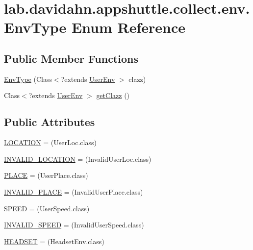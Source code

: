 \hypertarget{enumlab_1_1davidahn_1_1appshuttle_1_1collect_1_1env_1_1_env_type}{\section{lab.\-davidahn.\-appshuttle.\-collect.\-env.\-Env\-Type \-Enum \-Reference}
\label{enumlab_1_1davidahn_1_1appshuttle_1_1collect_1_1env_1_1_env_type}
}
\subsection*{\-Public \-Member \-Functions}
\begin{DoxyCompactItemize}
\item 
\hyperlink{enumlab_1_1davidahn_1_1appshuttle_1_1collect_1_1env_1_1_env_type_a71e5659577c8af2c28bbef2caa61bb91}{\-Env\-Type} (\-Class$<$?extends \hyperlink{classlab_1_1davidahn_1_1appshuttle_1_1collect_1_1env_1_1_user_env}{\-User\-Env} $>$ clazz)
\item 
\-Class$<$?extends \hyperlink{classlab_1_1davidahn_1_1appshuttle_1_1collect_1_1env_1_1_user_env}{\-User\-Env} $>$ \hyperlink{enumlab_1_1davidahn_1_1appshuttle_1_1collect_1_1env_1_1_env_type_a51b2442353c7736d39ce93dc70b6fe68}{get\-Clazz} ()
\end{DoxyCompactItemize}
\subsection*{\-Public \-Attributes}
\begin{DoxyCompactItemize}
\item 
\hyperlink{enumlab_1_1davidahn_1_1appshuttle_1_1collect_1_1env_1_1_env_type_a513b43e6ae19fc27a54ea3e5dab0d8dd}{\-L\-O\-C\-A\-T\-I\-O\-N} = (\-User\-Loc.\-class)
\item 
\hyperlink{enumlab_1_1davidahn_1_1appshuttle_1_1collect_1_1env_1_1_env_type_adee403a5cfd19ab6c6db598f030f4e67}{\-I\-N\-V\-A\-L\-I\-D\-\_\-\-L\-O\-C\-A\-T\-I\-O\-N} = (\-Invalid\-User\-Loc.\-class)
\item 
\hyperlink{enumlab_1_1davidahn_1_1appshuttle_1_1collect_1_1env_1_1_env_type_a9be23479dc6fcfb275eb596bd226b914}{\-P\-L\-A\-C\-E} = (\-User\-Place.\-class)
\item 
\hyperlink{enumlab_1_1davidahn_1_1appshuttle_1_1collect_1_1env_1_1_env_type_a9ce16cf07ad3c05697cbfb3d6f70ed83}{\-I\-N\-V\-A\-L\-I\-D\-\_\-\-P\-L\-A\-C\-E} = (\-Invalid\-User\-Place.\-class)
\item 
\hyperlink{enumlab_1_1davidahn_1_1appshuttle_1_1collect_1_1env_1_1_env_type_ab7601899c6c2f54cbcc22c61b80e787d}{\-S\-P\-E\-E\-D} = (\-User\-Speed.\-class)
\item 
\hyperlink{enumlab_1_1davidahn_1_1appshuttle_1_1collect_1_1env_1_1_env_type_a3ccf1f4dee98bc0055f191000160b623}{\-I\-N\-V\-A\-L\-I\-D\-\_\-\-S\-P\-E\-E\-D} = (\-Invalid\-User\-Speed.\-class)
\item 
\hyperlink{enumlab_1_1davidahn_1_1appshuttle_1_1collect_1_1env_1_1_env_type_a8e93ddff120d7a2da240589ff11a6632}{\-H\-E\-A\-D\-S\-E\-T} = (\-Headset\-Env.\-class)
\end{DoxyCompactItemize}


